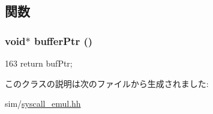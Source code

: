 \subsection{関数}
\hypertarget{classBufferArg_affc1f4fbd370639116a6918a46d9b58a}{
\subsubsection[{bufferPtr}]{\setlength{\rightskip}{0pt plus 5cm}void$\ast$ bufferPtr ()}}
\label{classBufferArg_affc1f4fbd370639116a6918a46d9b58a}



\begin{DoxyCode}
163 { return bufPtr; }
\end{DoxyCode}


このクラスの説明は次のファイルから生成されました:\begin{DoxyCompactItemize}
\item 
sim/\hyperlink{syscall__emul_8hh}{syscall\_\-emul.hh}\end{DoxyCompactItemize}

